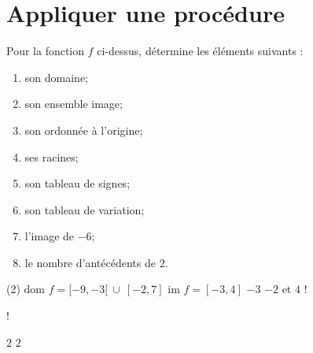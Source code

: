 \documentclass[a4paper, 12pt, parskip=half-]{scrartcl}
\begin{document}
\section*{ Appliquer une procédure}
\begin{appliquer}[points=10]
    \begin{center}
        
    \end{center}
    Pour la fonction $f$ ci-dessus, détermine les éléments suivants :
    \begin{enumerate}[cols=2]
        \item son domaine;
        \item son ensemble image;
        \item son ordonnée à l'origine;
        \item ses racines;
        \item son tableau de signes;
        \item son tableau de variation;
        \item l'image de $-6$;
        \item le nombre d'antécédents de $2$.
    \end{enumerate}
\end{appliquer}
\begin{solappliquer}
    \begin{tasks}(2)
        \task $\textrm{dom }f=[-9,-3[~\cup~[-2,7]$
        \task $\textrm{im }f=[-3,4]$
        \task $-3$
        \task $-2$ et $4$
        \task!
        \task!
        \task $2$
        \task $2$
    \end{tasks}
\end{solappliquer}
\end{document}
